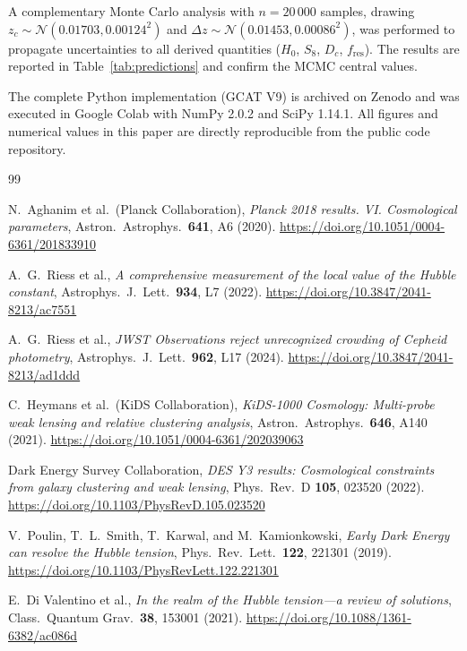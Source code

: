 \documentclass[12pt,a4paper]{article}
\theoremstyle{plain}
\theoremstyle{definition}
\theoremstyle{remark}
\begin{document}
A complementary Monte Carlo analysis with \(n=20\,000\) samples, drawing \(z_c \sim \mathcal{N}(0.01703, 0.00124^2)\) and \(\Delta z \sim \mathcal{N}(0.01453, 0.00086^2)\), was performed to propagate uncertainties to all derived quantities (\(H_0\), \(S_8\), \(D_c\), \(f_{\text{res}}\)). The results are reported in Table~\ref{tab:predictions} and confirm the MCMC central values.

The complete Python implementation (GCAT V9) is archived on Zenodo and was executed in Google Colab with NumPy 2.0.2 and SciPy 1.14.1. All figures and numerical values in this paper are directly reproducible from the public code repository.

\begin{thebibliography}{99}

N.~Aghanim et al.\ (Planck Collaboration), 
\emph{Planck 2018 results. VI. Cosmological parameters}, 
Astron.\ Astrophys.\ \textbf{641}, A6 (2020). 
\url{https://doi.org/10.1051/0004-6361/201833910}

A.~G.~Riess et al., 
\emph{A comprehensive measurement of the local value of the Hubble constant}, 
Astrophys.\ J.\ Lett.\ \textbf{934}, L7 (2022). 
\url{https://doi.org/10.3847/2041-8213/ac7551}

A.~G.~Riess et al., 
\emph{JWST Observations reject unrecognized crowding of Cepheid photometry}, 
Astrophys.\ J.\ Lett.\ \textbf{962}, L17 (2024). 
\url{https://doi.org/10.3847/2041-8213/ad1ddd}

C.~Heymans et al.\ (KiDS Collaboration), 
\emph{KiDS-1000 Cosmology: Multi-probe weak lensing and relative clustering analysis}, 
Astron.\ Astrophys.\ \textbf{646}, A140 (2021). 
\url{https://doi.org/10.1051/0004-6361/202039063}

Dark Energy Survey Collaboration, 
\emph{DES Y3 results: Cosmological constraints from galaxy clustering and weak lensing}, 
Phys.\ Rev.\ D \textbf{105}, 023520 (2022). 
\url{https://doi.org/10.1103/PhysRevD.105.023520}

V.~Poulin, T.~L.~Smith, T.~Karwal, and M.~Kamionkowski, 
\emph{Early Dark Energy can resolve the Hubble tension}, 
Phys.\ Rev.\ Lett.\ \textbf{122}, 221301 (2019). 
\url{https://doi.org/10.1103/PhysRevLett.122.221301}

E.~Di Valentino et al., 
\emph{In the realm of the Hubble tension---a review of solutions}, 
Class.\ Quantum Grav.\ \textbf{38}, 153001 (2021). 
\url{https://doi.org/10.1088/1361-6382/ac086d}


\end{thebibliography}
\end{document}
